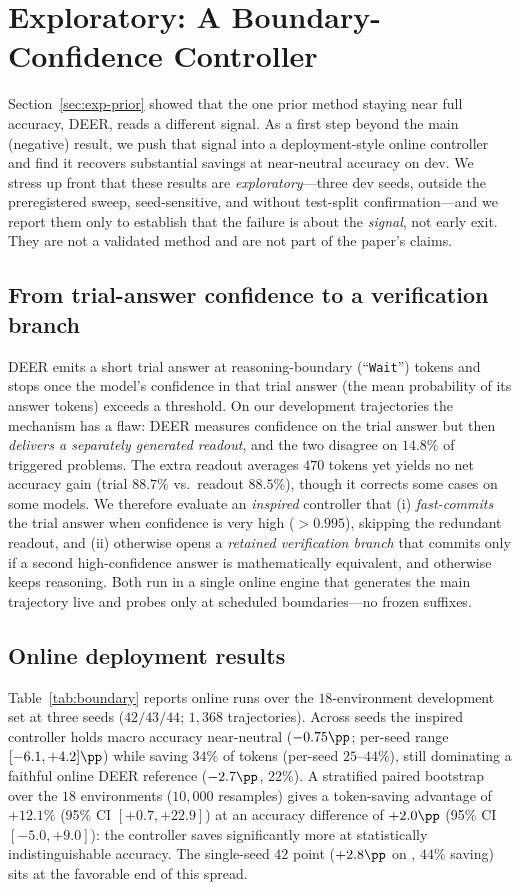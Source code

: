\section{Exploratory: A Boundary-Confidence Controller}
\label{sec:boundary}

Section~\ref{sec:exp-prior} showed that the one prior method staying near full
accuracy, DEER, reads a different signal. As a first step beyond the main
(negative) result, we push that signal into a deployment-style online controller
and find it recovers substantial savings at near-neutral accuracy on dev. We
stress up front that these results are \emph{exploratory}---three dev seeds,
outside the preregistered sweep, seed-sensitive, and without test-split
confirmation---and we report them only to establish that the failure is about the
\emph{signal}, not early exit. They are not a validated method and are not part
of the paper's claims.

\subsection{From trial-answer confidence to a verification branch}
DEER emits a short trial answer at reasoning-boundary (``\texttt{Wait}'')
tokens and stops once the model's confidence in that trial answer (the mean
probability of its answer tokens) exceeds a threshold. On our development
trajectories the mechanism has a flaw: DEER measures confidence on the trial
answer but then \emph{delivers a separately generated readout}, and the two
disagree on $14.8\%$ of triggered problems. The extra readout averages $470$
tokens yet yields no net accuracy gain (trial $88.7\%$ vs.\ readout $88.5\%$),
though it corrects some cases on some models. We therefore evaluate an
\emph{inspired} controller that (i) \emph{fast-commits} the trial answer when
confidence is very high ($>\!0.995$), skipping the redundant readout, and (ii)
otherwise opens a \emph{retained verification branch} that commits only if a
second high-confidence answer is mathematically equivalent, and otherwise keeps
reasoning. Both run in a single online engine that generates the main trajectory
live and probes only at scheduled boundaries---no frozen suffixes.

\subsection{Online deployment results}
Table~\ref{tab:boundary} reports online runs over the $18$-environment
development set at three seeds ($42/43/44$; $1{,}368$ trajectories). Across seeds
the inspired controller holds macro accuracy near-neutral ($-0.75\pp$; per-seed
range $[-6.1, +4.2]\pp$) while saving $34\%$ of tokens (per-seed $25$--$44\%$),
still dominating a faithful online DEER reference ($-2.7\pp$, $22\%$). A
stratified paired bootstrap over the $18$ environments ($10{,}000$ resamples)
gives a token-saving advantage of $+12.1\%$ (95\% CI $[+0.7, +22.9]$) at an
accuracy difference of $+2.0\pp$ (95\% CI $[-5.0, +9.0]$): the controller saves
significantly more at statistically indistinguishable accuracy. The single-seed
$42$ point ($+2.8\pp$ on \qweneight{}, $44\%$ saving) sits at the favorable end
of this spread.

